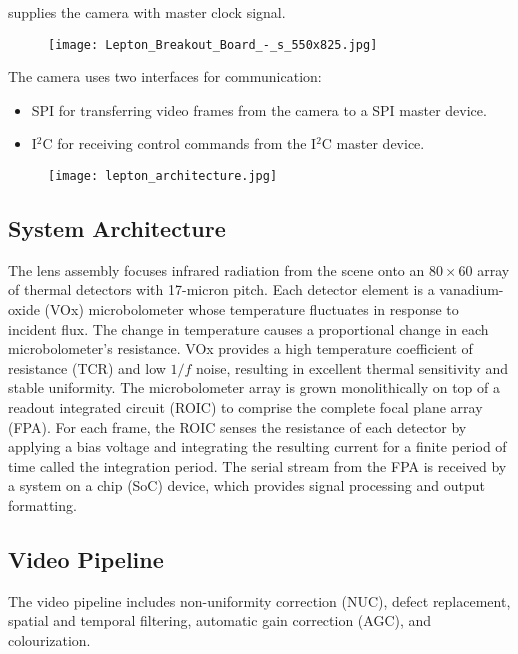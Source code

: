 supplies the camera with master clock signal.\cite{breakoutboard}
%
\begin{figure}[!htb]
    \centering
    \texttt{[image: Lepton\_Breakout\_Board\_-\_s\_550x825.jpg]}
    \label{fig:breakoutboard}
 \end{figure}
\linebreak The camera uses two interfaces for communication:
\begin{itemize}
    \item SPI for transferring video frames from the camera to a SPI master
device.
    \item I$^{2}$C for receiving control commands from the I$^{2}$C master
device.
\end{itemize}
%
\begin{figure}[htb]
    \centering
    \texttt{[image: lepton\_architecture.jpg]}
    \label{fig:leptonarchitecture}
\end{figure}
%
\subsection{System Architecture}
\label{ssec:leptonarchitecture}
The lens assembly focuses infrared radiation from the scene onto an $80 \times
60$ array of thermal detectors with 17-micron pitch. Each detector element is a
vanadium-oxide (VOx) microbolometer whose temperature fluctuates in response to
incident flux. The change in temperature causes a proportional change in each
microbolometer’s resistance. VOx provides a high temperature coefficient of
resistance (TCR) and low $1/f$ noise, resulting in excellent thermal sensitivity
and stable uniformity. The microbolometer array is grown monolithically on top
of a readout integrated circuit (ROIC) to comprise the complete focal plane
array (FPA). 
For each frame, the ROIC senses the resistance of each detector by
applying a bias voltage and integrating the resulting current for a finite
period of time called the integration period. The serial stream from the FPA is
received by a system on a chip (SoC) device, which provides signal processing
and output formatting.
%
\subsection{Video Pipeline}
\label{ssec:pipeline}
The video pipeline includes non-uniformity correction (NUC), defect replacement,
spatial and temporal filtering, automatic gain correction (AGC), and
colourization.
%
\begin{figure}[!h]
    \centering
    \resizebox{0.75\textwidth}{!}{}
    \label{fig:videopipe}
\end{figure}
